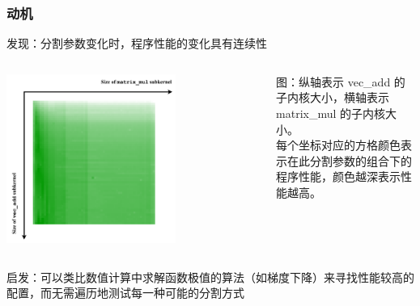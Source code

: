 \documentclass[aspectratio=169]{ctexbeamer}
\begin{document}
\begin{frame}
  \frametitle{动机}
  \large{发现：分割参数变化时，程序性能的变化具有连续性}
  \begin{columns}
    \begin{column}{0.5\textwidth}
      \begin{flushright}
        \includegraphics[width=0.67\textwidth]{figures/consistency.drawio.pdf}
      \end{flushright}
    \end{column}
    \begin{column}{0.5\textwidth}
      图：\footnotesize{纵轴表示 vec\_add 的子内核大小，横轴表示 matrix\_mul 的子内核大小。}\\
    \footnotesize{每个坐标对应的方格颜色表示在此分割参数的组合下的程序性能，颜色越深表示性能越高。}
    \end{column}
  \end{columns}

  启发：可以类比数值计算中求解函数极值的算法（如梯度下降）来寻找性能较高的配置，而无需遍历地测试每一种可能的分割方式
\end{frame}
\end{document}
